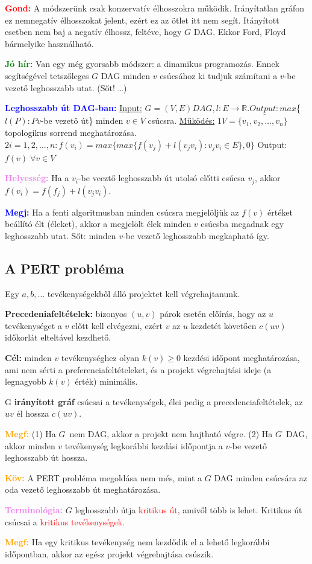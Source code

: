\documentclass[../szamtud.tex]{subfiles}
\begin{document}
        \textcolor{red}{\textbf{Gond:}} A módszerünk csak konzervatív élhosszokra működik. Irányítatlan gráfon ez nemnegatív élhosszokat jelent, ezért ez az ötlet itt nem segít. Itányított esetben nem baj a negatív élhossz, feltéve, hogy $G$ DAG. Ekkor Ford, Floyd bármelyike használható.

        \textcolor{green}{\textbf{Jó hír:}} Van egy még gyorsabb módszer: a dinamikus programozás. Ennek segítségével tetszőleges $G$ DAG minden $v$ csúcsához ki tudjuk számítani a $v$-be vezető leghosszabb utat. (Sőt! \dots)

        \textcolor{blue}{\textbf{Leghosszabb út DAG-ban:}} \underline{Input:} $G = (V,E) DAG, l:E \rightarrow \mathbb{R}. \underline{Output:} max$\{$l(P):P v$-be vezető út\} minden $v \in V$ csúcsra. \underline{Működés:} $\boxed{1} V = \{v_1,v_2,\dots,v_n\}$ topologikus sorrend meghatározása. $\boxed{2} i = 1,2,\dots,n: f(v_i) = max\{max\{f(v_j)+l(v_jv_i):v_jv_i \in E\},0\}$ Output: $f(v)\; \forall v \in V$

        \textcolor{violet}{\textbf{Helyesség:}} Ha a $v_i$-be veeztő leghosszabb út utolsó előtti csúcsa $v_j$, akkor $f(v_i) = f(f_j) + l(v_jv_i)$.

        \textcolor{blue}{\textbf{Megj:}} Ha a fenti algoritmusban minden csúcsra megjelöljük az $f(v)$ értéket beállító élt (éleket), akkor a megjelölt élek minden $v$ csúcsba megadnak egy leghosszabb utat. Sőt: minden $v$-be vezető leghosszabb megkapható így.

    \subsection{A PERT probléma}

        Egy $a,b,\dots$ tevékenységekből álló projektet kell végrehajtanunk. 

        \textbf{Precedeniafeltételek:} bizonyos $(u,v)$ párok esetén előírás, hogy az $u$ tevékenységet a $v$ előtt kell elvégezni, ezért $v$ az $u$ kezdetét követően $c(uv)$ időkorlát elteltável kezdhető.

        \textbf{Cél:} minden $v$ tevékenységhez olyan $k(v) \geq 0$ kezdési időpont meghatározása, ami nem sérti a preferenciafeltételeket, és a projekt végrehajtási ideje (a legnagyobb $k(v)$ érték) minimális.

        G \textbf{irányított gráf} csúcsai a tevékenységek, élei pedig a precedenciafeltételek, az $uv$ él hossza $c(uv)$.

        \textcolor{orange}{\textbf{Megf:}} (1) Ha $G$ nem DAG, akkor a projekt nem hajtható végre. (2) Ha $G$ DAG, akkor minden $v$ tevékenység legkorábbi kezdási időpontja a $v$-be vezető leghosszabb út hossza.

        \textcolor{orange}{\textbf{Köv:}} A PERT probléma megoldása nem més, mint a $G$ DAG minden csúcsára az oda vezető leghosszabb út meghatározása.

        \textcolor{violet}{\textbf{Terminológia:}} $G$ leghosszabb útja \textcolor{red}{kritikus út}, amivől több is lehet. Kritikus út csúcsai a \textcolor{red}{kritikus tevékenységek.}

        \textcolor{orange}{\textbf{Megf:}} Ha egy kritikus tevékenység nem kezdődik el a lehető legkorábbi időpontban, akkor az egész projekt végrehajtása csúszik.
\end{document}

